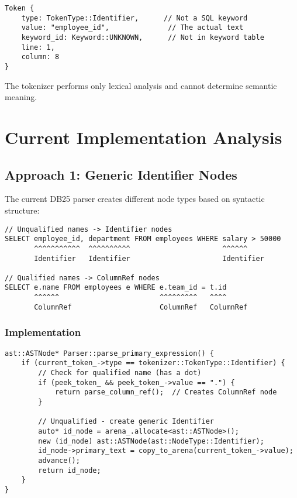\documentclass[11pt,a4paper]{article}
\begin{document}
\begin{lstlisting}[style=cpp]
Token {
    type: TokenType::Identifier,      // Not a SQL keyword
    value: "employee_id",              // The actual text
    keyword_id: Keyword::UNKNOWN,      // Not in keyword table
    line: 1,
    column: 8
}
\end{lstlisting}

The tokenizer performs only lexical analysis and cannot determine semantic meaning.

\section{Current Implementation Analysis}

\subsection{Approach 1: Generic Identifier Nodes}

The current DB25 parser creates different node types based on syntactic structure:

\begin{lstlisting}[style=cpp]
// Unqualified names -> Identifier nodes
SELECT employee_id, department FROM employees WHERE salary > 50000
       ^^^^^^^^^^^  ^^^^^^^^^^                      ^^^^^^
       Identifier   Identifier                      Identifier

// Qualified names -> ColumnRef nodes  
SELECT e.name FROM employees e WHERE e.team_id = t.id
       ^^^^^^                        ^^^^^^^^^   ^^^^
       ColumnRef                     ColumnRef   ColumnRef
\end{lstlisting}

\subsubsection{Implementation}

\begin{lstlisting}[style=cpp]
ast::ASTNode* Parser::parse_primary_expression() {
    if (current_token_->type == tokenizer::TokenType::Identifier) {
        // Check for qualified name (has a dot)
        if (peek_token_ && peek_token_->value == ".") {
            return parse_column_ref();  // Creates ColumnRef node
        }
        
        // Unqualified - create generic Identifier
        auto* id_node = arena_.allocate<ast::ASTNode>();
        new (id_node) ast::ASTNode(ast::NodeType::Identifier);
        id_node->primary_text = copy_to_arena(current_token_->value);
        advance();
        return id_node;
    }
}
\end{lstlisting}
\end{document}
